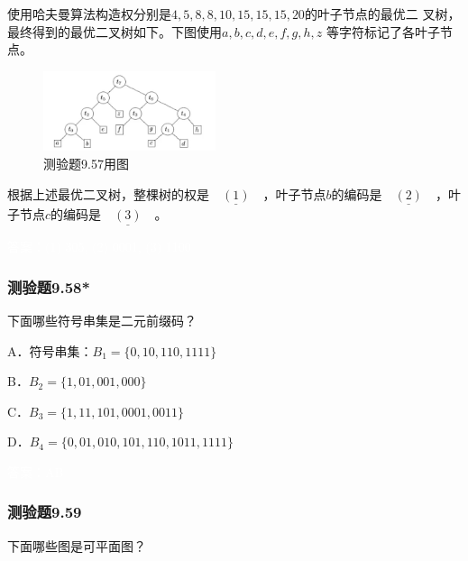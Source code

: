 \documentclass[UTF8, heading=true]{ctexart}
\begin{document}
使用哈夫曼算法构造权分别是$4,5, 8, 8, 10, 15, 15, 15,20$的叶子节点的最优二
叉树，最终得到的最优二叉树如下。下图使用$a, b, c, d, e, f, g,h, z$
等字符标记了各叶子节点。

\begin{figure}[H]
  \centering
  \includegraphics[width=0.45\textwidth]{9.57.jpg} %
  \caption{测验题9.57用图}
\end{figure}

根据上述最优二叉树，整棵树的权是$\underline{\quad (1) \quad}$，叶子节点$b$的编码是$\underline{\quad (2)\quad}$，叶子节点$c$的编码是$\underline{\quad (3)\quad}$。

\textcolor{white}{答案：(1) 305, (2) 0001, (3) 1100}

\subsubsection{测验题9.58*}

下面哪些符号串集是二元前缀码？

A．符号串集：$B_1 =\{0,10,110,1111\}$

B．$B_2=\{1,01,001,000\}$

C．$B_3=\{1,11,101,0001,0011\}$

D．$B_4=\{0,01,010,101,110,1011,1111\}$

\textcolor{white}{答案：AB}

\subsubsection{测验题9.59}

下面哪些图是可平面图？
\end{document}
